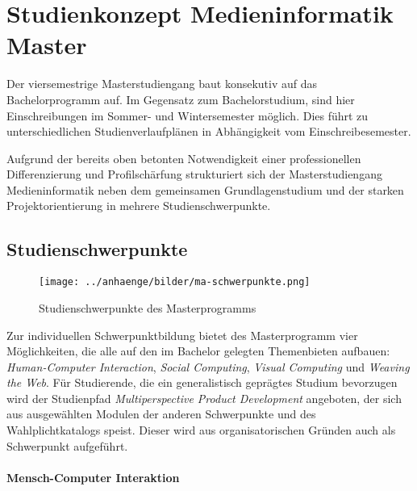 \section{Studienkonzept Medieninformatik
Master\label{/mi-2017/selbstbericht/0400-studiengangskonzept/0000-studiengangskonzept}}\label{studienkonzept-medieninformatik-masterpathlabelmi-2017selbstbericht0400-studiengangskonzept0000-studiengangskonzept}

Der viersemestrige Masterstudiengang baut konsekutiv auf das
Bachelorprogramm auf. Im Gegensatz zum Bachelorstudium, sind hier
Einschreibungen im Sommer- und Wintersemester möglich. Dies führt zu
unterschiedlichen Studienverlaufplänen in Abhängigkeit vom
Einschreibesemester.

Aufgrund der bereits oben betonten Notwendigkeit einer professionellen
Differenzierung und Profilschärfung strukturiert sich der
Masterstudiengang Medieninformatik neben dem gemeinsamen
Grundlagenstudium und der starken Projektorientierung in mehrere
Studienschwerpunkte.

\subsection{Studienschwerpunkte\label{/mi-2017/selbstbericht/0400-studiengangskonzept/0000-studiengangskonzept}}\label{studienschwerpunktepathlabelmi-2017selbstbericht0400-studiengangskonzept0000-studiengangskonzept}

\begin{figure}[htbp]
\centering
\texttt{[image: ../anhaenge/bilder/ma-schwerpunkte.png]}
\caption{Studienschwerpunkte des Masterprogramms}
\end{figure}

Zur individuellen Schwerpunktbildung bietet des Masterprogramm vier
Möglichkeiten, die alle auf den im Bachelor gelegten Themenbieten
aufbauen: \emph{Human-Computer Interaction}, \emph{Social Computing},
\emph{Visual Computing} und \emph{Weaving the Web}. Für Studierende, die
ein generalistisch geprägtes Studium bevorzugen wird der Studienpfad
\emph{Multiperspective Product Development} angeboten, der sich aus
ausgewählten Modulen der anderen Schwerpunkte und des Wahlplichtkatalogs
speist. Dieser wird aus organisatorischen Gründen auch als Schwerpunkt
aufgeführt.

\paragraph{Mensch-Computer
Interaktion\label{/mi-2017/selbstbericht/0400-studiengangskonzept/0000-studiengangskonzept}}\label{mensch-computer-interaktionpathlabelmi-2017selbstbericht0400-studiengangskonzept0000-studiengangskonzept}

